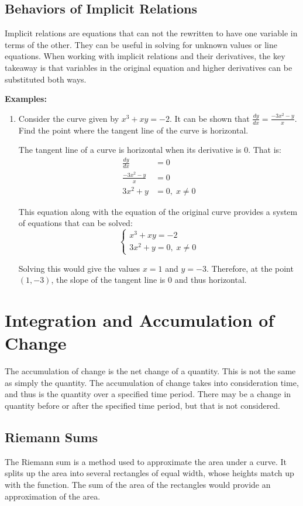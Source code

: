 \documentclass[12pt]{article}
\begin{document}
\subsection{Behaviors of Implicit Relations}
Implicit relations are equations that can not the rewritten to have one variable in terms of the other. They can be useful in solving for unknown values or line equations. When working with implicit relations and their derivatives, the key takeaway is that variables in the original equation and higher derivatives can be substituted both ways.

\noindent \textbf{Examples:}
\begin{enumerate}
	\item Consider the curve given by $x^3 + xy = -2$. It can be shown that $\frac{dy}{dx} = \frac{-3x^2 - y}{x}$. Find the point where the tangent line of the curve is horizontal.

	The tangent line of a curve is horizontal when its derivative is $0$. That is:
	\begin{align*}
		\frac{dy}{dx} &= 0 \\[5pt]
		\frac{-3x^2 - y}{x} &= 0 \\[5pt]
		3x^2 + y &= 0 , \; x \neq 0
	\end{align*}

	This equation along with the equation of the original curve provides a system of equations that can be solved:
	\[ \begin{cases}
		x^3 + xy = -2 \\
		3x^2 + y = 0 , \; x \neq 0
	\end{cases} \]

	Solving this would give the values $x = 1$ and $y = -3$. Therefore, at the point $(1, -3)$, the slope of the tangent line is $0$ and thus horizontal.
\end{enumerate}

\section{Integration and Accumulation of Change}
The accumulation of change is the net change of a quantity. This is not the same as simply the quantity. The accumulation of change takes into consideration time, and thus is the quantity over a specified time period. There may be a change in quantity before or after the specified time period, but that is not considered.

\subsection{Riemann Sums}
The Riemann sum is a method used to approximate the area under a curve. It splits up the area into several rectangles of equal width, whose heights match up with the function. The sum of the area of the rectangles would provide an approximation of the area.
\end{document}

